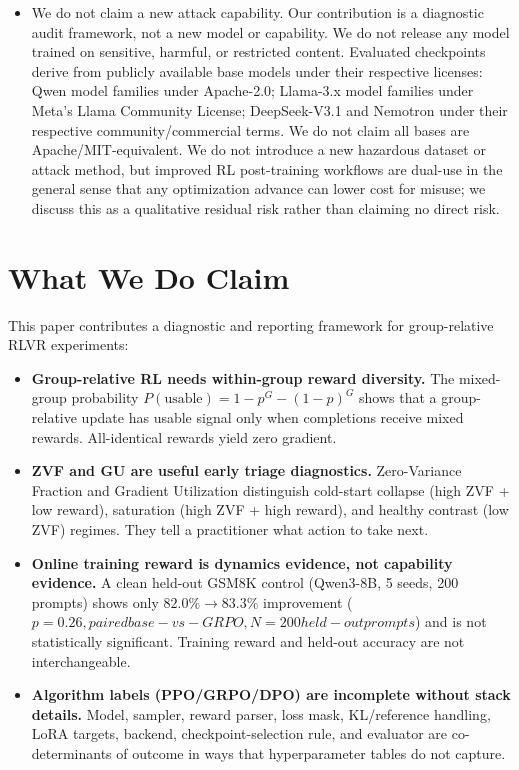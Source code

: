 \begin{itemize}
    \item We do not claim a new attack capability. Our contribution is a diagnostic audit framework, not a new model or capability. We do not release any model trained on sensitive, harmful, or restricted content. Evaluated checkpoints derive from publicly available base models under their respective licenses: Qwen model families under Apache-2.0; Llama-3.x model families under Meta's Llama Community License; DeepSeek-V3.1 and Nemotron under their respective community/commercial terms. We do not claim all bases are Apache/MIT-equivalent. We do not introduce a new hazardous dataset or attack method, but improved RL post-training workflows are dual-use in the general sense that any optimization advance can lower cost for misuse; we discuss this as a qualitative residual risk rather than claiming no direct risk.
\end{itemize}

\section*{What We Do Claim}
\label{sec:what_we_claim}

This paper contributes a diagnostic and reporting framework for group-relative RLVR experiments:

\begin{itemize}
    \item \textbf{Group-relative RL needs within-group reward diversity.} The mixed-group probability $P(\text{usable}) = 1 - p^G - (1-p)^G$ shows that a group-relative update has usable signal only when completions receive mixed rewards. All-identical rewards yield zero gradient.
    \item \textbf{ZVF and GU are useful early triage diagnostics.} Zero-Variance Fraction and Gradient Utilization distinguish cold-start collapse (high ZVF + low reward), saturation (high ZVF + high reward), and healthy contrast (low ZVF) regimes. They tell a practitioner what action to take next.
    \item \textbf{Online training reward is dynamics evidence, not capability evidence.} A clean held-out GSM8K control (Qwen3-8B, 5 seeds, 200 prompts) shows only $82.0\% \to 83.3\%$ improvement ($p=0.26, paired base-vs-GRPO, N=200 held-out prompts $) and is not statistically significant. Training reward and held-out accuracy are not interchangeable.
    \item \textbf{Algorithm labels (PPO/GRPO/DPO) are incomplete without stack details.} Model, sampler, reward parser, loss mask, KL/reference handling, LoRA targets, backend, checkpoint-selection rule, and evaluator are co-determinants of outcome in ways that hyperparameter tables do not capture.
\end{itemize}

